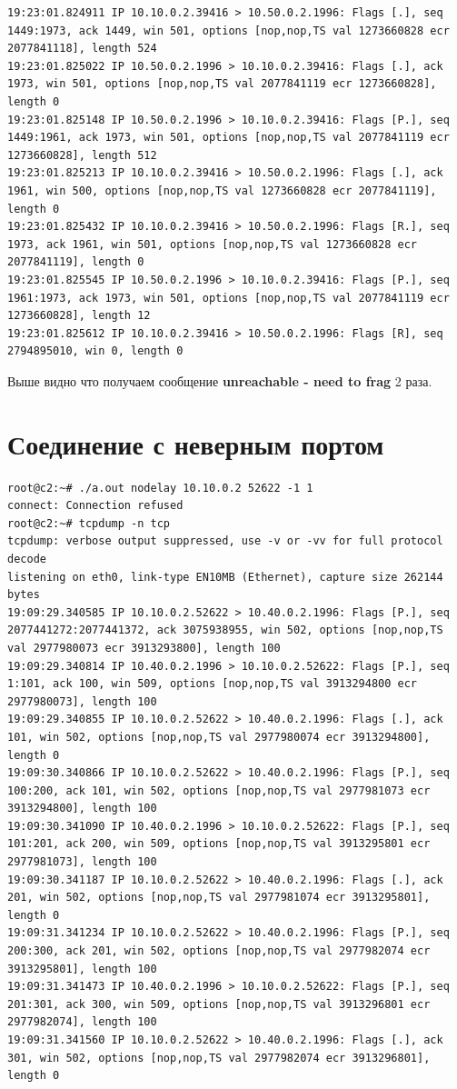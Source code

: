 \documentclass[a4paper,12pt]{article}
\begin{document}
\begin{Verbatim}
19:23:01.824911 IP 10.10.0.2.39416 > 10.50.0.2.1996: Flags [.], seq 1449:1973, ack 1449, win 501, options [nop,nop,TS val 1273660828 ecr 2077841118], length 524
19:23:01.825022 IP 10.50.0.2.1996 > 10.10.0.2.39416: Flags [.], ack 1973, win 501, options [nop,nop,TS val 2077841119 ecr 1273660828], length 0
19:23:01.825148 IP 10.50.0.2.1996 > 10.10.0.2.39416: Flags [P.], seq 1449:1961, ack 1973, win 501, options [nop,nop,TS val 2077841119 ecr 1273660828], length 512
19:23:01.825213 IP 10.10.0.2.39416 > 10.50.0.2.1996: Flags [.], ack 1961, win 500, options [nop,nop,TS val 1273660828 ecr 2077841119], length 0
19:23:01.825432 IP 10.10.0.2.39416 > 10.50.0.2.1996: Flags [R.], seq 1973, ack 1961, win 501, options [nop,nop,TS val 1273660828 ecr 2077841119], length 0
19:23:01.825545 IP 10.50.0.2.1996 > 10.10.0.2.39416: Flags [P.], seq 1961:1973, ack 1973, win 501, options [nop,nop,TS val 2077841119 ecr 1273660828], length 12
19:23:01.825612 IP 10.10.0.2.39416 > 10.50.0.2.1996: Flags [R], seq 2794895010, win 0, length 0
\end{Verbatim}

Выше видно что получаем сообщение \textbf{unreachable - need to frag} 2 раза.

\section{Соединение с неверным портом}

\begin{Verbatim}
root@c2:~# ./a.out nodelay 10.10.0.2 52622 -1 1
connect: Connection refused
root@c2:~# tcpdump -n tcp
tcpdump: verbose output suppressed, use -v or -vv for full protocol decode
listening on eth0, link-type EN10MB (Ethernet), capture size 262144 bytes
19:09:29.340585 IP 10.10.0.2.52622 > 10.40.0.2.1996: Flags [P.], seq 2077441272:2077441372, ack 3075938955, win 502, options [nop,nop,TS val 2977980073 ecr 3913293800], length 100
19:09:29.340814 IP 10.40.0.2.1996 > 10.10.0.2.52622: Flags [P.], seq 1:101, ack 100, win 509, options [nop,nop,TS val 3913294800 ecr 2977980073], length 100
19:09:29.340855 IP 10.10.0.2.52622 > 10.40.0.2.1996: Flags [.], ack 101, win 502, options [nop,nop,TS val 2977980074 ecr 3913294800], length 0
19:09:30.340866 IP 10.10.0.2.52622 > 10.40.0.2.1996: Flags [P.], seq 100:200, ack 101, win 502, options [nop,nop,TS val 2977981073 ecr 3913294800], length 100
19:09:30.341090 IP 10.40.0.2.1996 > 10.10.0.2.52622: Flags [P.], seq 101:201, ack 200, win 509, options [nop,nop,TS val 3913295801 ecr 2977981073], length 100
19:09:30.341187 IP 10.10.0.2.52622 > 10.40.0.2.1996: Flags [.], ack 201, win 502, options [nop,nop,TS val 2977981074 ecr 3913295801], length 0
19:09:31.341234 IP 10.10.0.2.52622 > 10.40.0.2.1996: Flags [P.], seq 200:300, ack 201, win 502, options [nop,nop,TS val 2977982074 ecr 3913295801], length 100
19:09:31.341473 IP 10.40.0.2.1996 > 10.10.0.2.52622: Flags [P.], seq 201:301, ack 300, win 509, options [nop,nop,TS val 3913296801 ecr 2977982074], length 100
19:09:31.341560 IP 10.10.0.2.52622 > 10.40.0.2.1996: Flags [.], ack 301, win 502, options [nop,nop,TS val 2977982074 ecr 3913296801], length 0
\end{Verbatim}
\end{document}
